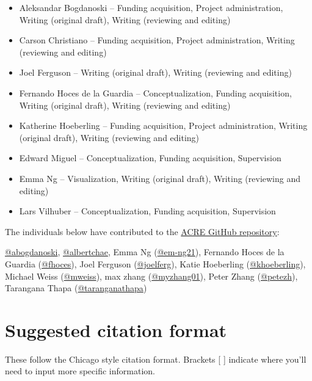 \documentclass[
  openany]{book}
\providecommand{\tightlist}{%
  \setlength{\itemsep}{0pt}\setlength{\parskip}{0pt}}
\begin{document}
\begin{itemize}
\tightlist
\item
  Aleksandar Bogdanoski -- Funding acquisition, Project administration, Writing (original draft), Writing (reviewing and editing)
\item
  Carson Christiano -- Funding acquisition, Project administration, Writing (reviewing and editing)
\item
  Joel Ferguson -- Writing (original draft), Writing (reviewing and editing)
\item
  Fernando Hoces de la Guardia -- Conceptualization, Funding acquisition, Writing (original draft), Writing (reviewing and editing)
\item
  Katherine Hoeberling -- Funding acquisition, Project administration, Writing (original draft), Writing (reviewing and editing)
\item
  Edward Miguel -- Conceptualization, Funding acquisition, Supervision
\item
  Emma Ng -- Visualization, Writing (original draft), Writing (reviewing and editing)
\item
  Lars Vilhuber -- Conceptualization, Funding acquisition, Supervision
\end{itemize}

The individuals below have contributed to the \href{https://github.com/BITSS/ACRE}{ACRE GitHub repository}:

\href{https://github.com/abogdanoski}{@abogdanoski}, \href{https://github.com/albertchae}{@albertchae}, Emma Ng (\href{https://github.com/em-ng21}{@em-ng21}), Fernando Hoces de la Guardia (\href{https://github.com/fhoces}{@fhoces}), Joel Ferguson (\href{https://github.com/joelferg}{@joelferg}), Katie Hoeberling (\href{https://github.com/khoeberling}{@khoeberling}), Michael Weiss (\href{https://github.com/mweiss}{@mweiss}), max zhang (\href{https://github.com/myzhang01}{@myzhang01}), Peter Zhang (\href{https://github.com/petezh}{@petezh}), Tarangana Thapa (\href{https://github.com/taranganathapa}{@taranganathapa})

\hypertarget{suggested-citation-format}{%
\section{Suggested citation format}\label{suggested-citation-format}}

These follow the Chicago style citation format. Brackets {[} {]} indicate where you'll need to input more specific information.
\end{document}
